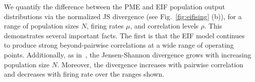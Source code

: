 \documentclass[%
 reprint,
 twocolumn,
 amsmath,amssymb,
 aps,
floatfix,
]{revtex4}
\newcommand{\Ecomment}[1]{\textcolor{red}{[E: #1]}}
\begin{document}
We quantify the difference between the PME and EIF population output distributions via the normalized JS divergence (see Fig.~\ref{fig:eifising} (b)), for a range of population sizes $N$, firing rates $\mu$, and correlation levels $\rho$.  This demonstrates several important facts.  The first is that the EIF model continues to produce strong beyond-pairwise correlations at a wide range of operating points.  Additionally, as in~\cite{Macke, cf. Roudi}, the Jensen-Shannon divergence grows with increasing population size $N$.  Moreover, the divergence increases with pairwise correlation and decreases with firing rate over the ranges shown.

%
%
%
%

\end{document}
